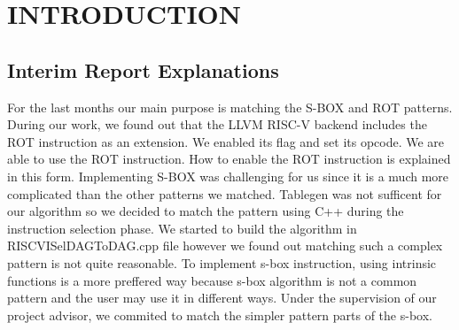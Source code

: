 \chapter{INTRODUCTION}\label{Ch1}


\section{Interim Report Explanations}\label{plan}


For the last months our main purpose is matching the S-BOX and ROT patterns. During our work, we found out that the LLVM RISC-V backend includes the ROT instruction as an extension. We enabled its flag and set its opcode. We are able to use the ROT instruction. How to enable the ROT instruction is explained in this form. Implementing S-BOX was challenging for us since it is a much more complicated than the other patterns we matched. Tablegen was not sufficent for our algorithm so we decided to match the pattern using C++ during the instruction selection phase. We started to build the algorithm in RISCVISelDAGToDAG.cpp file however we found out matching such a complex pattern is not quite reasonable. To implement s-box instruction, using intrinsic functions is a more preffered way because s-box algorithm is not a common pattern and the user may use it in different ways. Under the supervision of our project advisor, we commited to match the simpler pattern parts of the s-box.  
